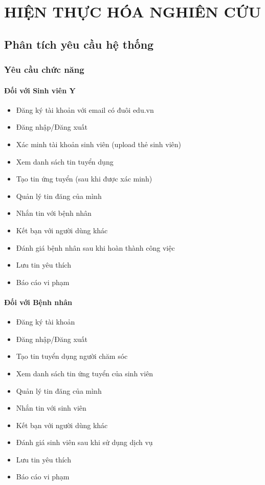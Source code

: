 \documentclass[13pt,a4paper]{extreport}
\begin{document}
\newpage

\chapter{HIỆN THỰC HÓA NGHIÊN CỨU}

\section{Phân tích yêu cầu hệ thống}

\subsection{Yêu cầu chức năng}

\subsubsection{Đối với Sinh viên Y}
\begin{itemize}
    \item Đăng ký tài khoản với email có đuôi edu.vn
    \item Đăng nhập/Đăng xuất
    \item Xác minh tài khoản sinh viên (upload thẻ sinh viên)
    \item Xem danh sách tin tuyển dụng
    \item Tạo tin ứng tuyển (sau khi được xác minh)
    \item Quản lý tin đăng của mình
    \item Nhắn tin với bệnh nhân
    \item Kết bạn với người dùng khác
    \item Đánh giá bệnh nhân sau khi hoàn thành công việc
    \item Lưu tin yêu thích
    \item Báo cáo vi phạm
\end{itemize}

\subsubsection{Đối với Bệnh nhân}
\begin{itemize}
    \item Đăng ký tài khoản
    \item Đăng nhập/Đăng xuất
    \item Tạo tin tuyển dụng người chăm sóc
    \item Xem danh sách tin ứng tuyển của sinh viên
    \item Quản lý tin đăng của mình
    \item Nhắn tin với sinh viên
    \item Kết bạn với người dùng khác
    \item Đánh giá sinh viên sau khi sử dụng dịch vụ
    \item Lưu tin yêu thích
    \item Báo cáo vi phạm
\end{itemize}
\end{document}
